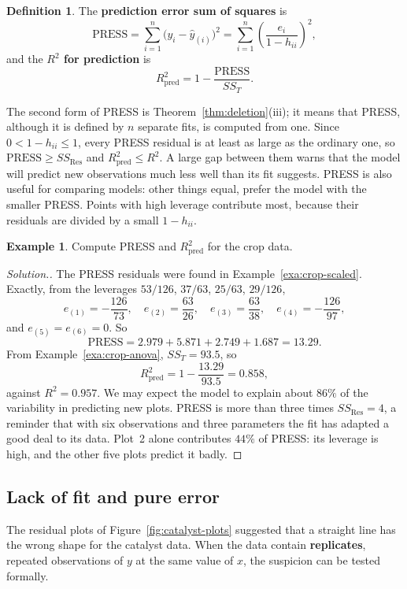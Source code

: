\documentclass[11pt,a4paper]{article}
\numberwithin{equation}{section}
\theoremstyle{definition}
\newtheorem{defn}[thm]{Definition}
\newtheorem{exa}[thm]{Example}
\newenvironment{solution}
  {\renewcommand{\qedsymbol}{}\begin{proof}[\textit{Solution}.]}
  {\end{proof}}
\begin{document}
\begin{defn}
The \textbf{prediction error sum of squares} is
\[
\mathrm{PRESS} = \sum_{i=1}^n \bigl(y_i - \hat y_{(i)}\bigr)^2
= \sum_{i=1}^n \left(\frac{e_i}{1 - h_{ii}}\right)^2 ,
\]
and the \textbf{$R^2$ for prediction} is
\[
R^2_{\mathrm{pred}} = 1 - \frac{\mathrm{PRESS}}{SS_T} .
\]
\end{defn}

The second form of PRESS is Theorem~\ref{thm:deletion}(iii); it means that PRESS, although
it is defined by $n$ separate fits, is computed from one. Since $0 < 1 - h_{ii} \le 1$,
every PRESS residual is at least as large as the ordinary one, so
$\mathrm{PRESS} \ge SS_{\mathrm{Res}}$ and $R^2_{\mathrm{pred}} \le R^2$. A large gap between
them warns that the model will predict new observations much less well than its fit
suggests. PRESS is also useful for comparing models: other things equal, prefer the model
with the smaller PRESS. Points with high leverage contribute most, because their residuals
are divided by a small $1 - h_{ii}$.

\begin{exa}\label{exa:crop-press}
Compute PRESS and $R^2_{\mathrm{pred}}$ for the crop data.
\end{exa}

\begin{solution}
The PRESS residuals were found in Example~\ref{exa:crop-scaled}. Exactly, from the
leverages $53/126$, $37/63$, $25/63$, $29/126$,
\[
e_{(1)} = -\frac{126}{73}, \quad e_{(2)} = \frac{63}{26}, \quad
e_{(3)} = \frac{63}{38}, \quad e_{(4)} = -\frac{126}{97},
\]
and $e_{(5)} = e_{(6)} = 0$. So
\[
\mathrm{PRESS} = 2.979 + 5.871 + 2.749 + 1.687 = 13.29 .
\]
From Example~\ref{exa:crop-anova}, $SS_T = 93.5$, so
\[
R^2_{\mathrm{pred}} = 1 - \frac{13.29}{93.5} = 0.858 ,
\]
against $R^2 = 0.957$. We may expect the model to explain about $86\%$ of the variability
in predicting new plots. PRESS is more than three times $SS_{\mathrm{Res}} = 4$, a reminder
that with six observations and three parameters the fit has adapted a good deal to its
data. Plot~2 alone contributes $44\%$ of PRESS: its leverage is high, and the other five
plots predict it badly.
\end{solution}

\subsection{Lack of fit and pure error}\label{ssec:lof}
The residual plots of Figure~\ref{fig:catalyst-plots} suggested that a straight line has the
wrong shape for the catalyst data. When the data contain \textbf{replicates}, repeated
observations of $y$ at the same value of $x$, the suspicion can be tested formally.
\end{document}
